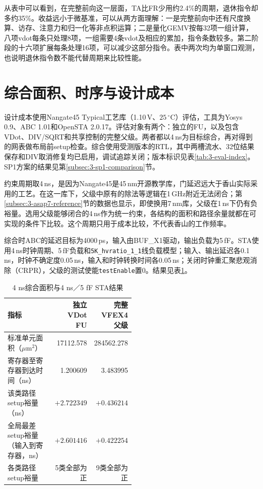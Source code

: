 从表中可以看到，在完整前向这一层面，TA比FR少用约2.4\%的周期，退休指令却多约35\%。收益远小于微基准，可以从两方面理解：一是完整前向中还有尺度换算、访存、注意力和归一化等非点积运算；二是量化GEMV按每32项一组计算，八项vdot每条只处理8项，一组需要4条vdot及相应的累加，指令条数较多。第二阶段的十六项扩展每条处理16项，可以减少这部分指令。表中两次均为单窗口观测，也说明退休指令数不能代替周期来比较性能。

\section{综合面积、时序与设计成本}\label{sec:3-cost}
设计成本使用Nangate45 Typical工艺库（1.10\,V、$25\,^{\circ}\mathrm{C}$）评估，工具为Yosys 0.9、ABC 1.01和OpenSTA 2.0.17。评估对象有两个：独立的FU，以及包含VDot、DIV/SQRT和共享控制的完整父级。两者都以4\,ns为目标综合，再对得到的网表做布局前setup检查。综合使用受测版本的RTL，其中两槽流水、32位结果保存和DIV取消修复均已启用，调试追踪关闭；版本标识见表\ref{tab:3-eval-index}。SP1方案的结果见第\ref{subsec:3-sp1-comparison}节。

约束周期取4\,ns，是因为Nangate45是45\,nm开源教学库，门延迟远大于香山实际采用的工艺。在这一库下，父级中原有的除法等逻辑在1\,GHz附近无法闭合；第\ref{subsec:3-asap7-reference}节的数据也显示，即使换用7\,nm库，父级在1\,ns下仍有负裕量。选用父级能够闭合的4\,ns作为统一约束，各结构的面积和路径余量就都在可实现的条件下比较。这个周期只用于成本比较，不代表香山的工作频率。

综合时ABC的延迟目标为4000\,ps，输入由BUF\_X1驱动，输出负载为5\,fF。STA使用4\,ns时钟周期、5\,fF负载和\texttt{5K\_hvratio\_1\_1}线负载模型；输入、输出延迟各0.1\,ns，时钟不确定度0.05\,ns，输入和时钟转换时间各0.05\,ns；关闭时钟重汇聚悲观消除（CRPR），父级的测试使能\texttt{testEnable}置0。结果见表\ref{tab:3-area-sta}。

\begin{table}[!htbp]\centering
\small
\caption{4 ns综合面积与4 ns／5 fF STA结果}\label{tab:3-area-sta}
\begin{tabular}{p{0.50\linewidth}rr}
\toprule
指标 & 独立VDot FU & 完整VFEX4父级\\
\midrule
标准单元面积（$\mu\mathrm{m}^{2}$） & 17112.578 & 284562.278\\
寄存器至寄存器到达时间（ns） & 1.200609 & 3.483995\\
该类路径setup裕量（ns） & $+2.722349$ & $+0.436214$\\
全局最差setup裕量（输入到寄存器，ns） & $+2.601416$ & $+0.422254$\\
各类路径setup裕量 & 5类全部为正 & 9类全部为正\\
\bottomrule
\end{tabular}
\end{table}

